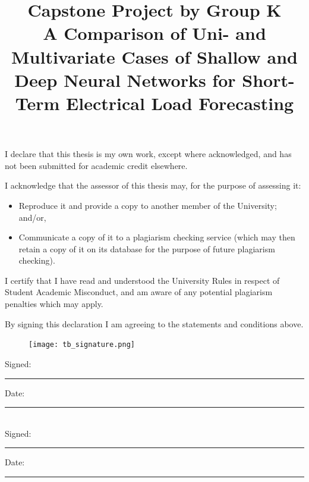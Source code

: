 \documentclass[mstat,12pt]{unswthesis}
\title{Capstone Project by Group K\\[0.5cm]A Comparison of Uni- and Multivariate Cases of Shallow and Deep Neural Networks for Short-Term Electrical Load Forecasting}
\author{\Authornameonly}
\begin{document}
\beforepreface




\vskip 2pc \noindent I declare that this thesis is my
own work, except where acknowledged, and has not been submitted for
academic credit elsewhere. 

\vskip 2pc  \noindent I acknowledge that the assessor of this
thesis may, for the purpose of assessing it:
\begin{itemize}
\item Reproduce it and provide a copy to another member of the University; and/or,
\item Communicate a copy of it to a plagiarism checking service (which may then retain a copy of it on its database for the purpose of future plagiarism checking).
\end{itemize}

\vskip 2pc \noindent I certify that I have read and understood the University Rules in
respect of Student Academic Misconduct, and am aware of any potential plagiarism penalties which may 
apply.\vspace{24pt}

\vskip 2pc \noindent By signing 
this declaration I am
agreeing to the statements and conditions above.
\vskip 2pc \noindent
\begin{figure}[H]
    \centering
    \texttt{[image: tb\_signature.png]}
\end{figure}
Signed: \rule{7cm}{0.25pt} \hfill Date: \rule{4cm}{0.25pt} \\[1cm]
Signed: \rule{7cm}{0.25pt} \hfill Date: \rule{4cm}{0.25pt} \\[1cm]
\vskip 1pc




% 
% 
% 
\end{document}
